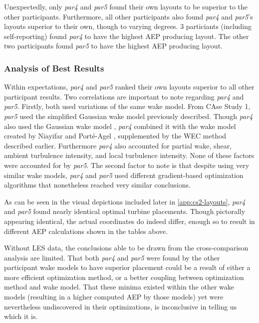 	Unexpectedly, only \textit{par4} and \textit{par5} found their own layouts to be superior to the other participants.
	Furthermore, all other participants also found \textit{par4} and \textit{par5}'s layouts superior to their own, though to varying degrees.
	3 particiants (including self-reporting) found \textit{par4} to have the highest AEP producing layout.
	The other two participants found \textit{par5} to have the highest AEP producing layout.

\subsubsection{Analysis of Best Results}

	Within expectations, \textit{par4} and \textit{par5} ranked their own layouts superior to all other participant results.
	Two correlations are important to note regarding \textit{par4} and \textit{par5}.
	Firstly, both used variations of the same wake model.
	From CAse Study 1, \textit{par5} used the simplified Gaussian wake model previously described\cite{Bastankhah2016,Thomas2018}.
	Though \textit{par4} also used the Gaussian wake model \cite{Bastankhah2016}, \textit{par4} combined it with the wake model created by Niayifar and Porté-Agel \cite{Niayifar2016}, supplemented by the WEC method described earlier.
	Furthermore \textit{par4} also accounted for partial wake, shear, ambient turbulence intensity, and local turbulence intensity.
	None of these factors were accounted for by \textit{par5}.
	The second factor to note is that despite using very similar wake models, \textit{par4} and \textit{par5} used different gradient-based optimization algorithms that nonetheless reached very similar conclusions.

	As can be seen in the visual depictions included later in \cref{app:cs2-layouts}, \textit{par4} and \textit{par5} found nearly identical optimal turbine placements.
	Though pictorally appearing identical, the actual coordinates do indeed differ, enough so to result in different AEP calculations shown in the tables above.

	Without LES data, the conclusions able to be drawn from the cross-comparison analysis are limited.
	That both \textit{par4} and \textit{par5} were found by the other participant wake models to have superior placement could be a result of either a more efficient optimization method, or a better coupling between optimization method and wake model.
	That these minima existed within the other wake models (resulting in a higher computed AEP by those models) yet were nevertheless undiscovered in their optimizations, is inconclusive in telling us which it is.

